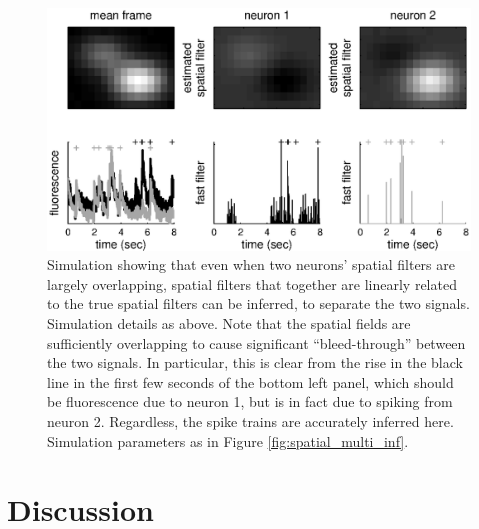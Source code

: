 \documentclass{article}
\begin{document}
\begin{figure}[h!]
\centering \includegraphics[width=.9\linewidth]{spatial_multi_learn}
\caption[overlapping spatial filters can be estimated]{Simulation showing that even when two neurons' spatial filters are largely overlapping, spatial filters that together are linearly related to the true spatial filters can be inferred, to separate the two signals. Simulation details as above. Note that the spatial fields are sufficiently overlapping to cause significant ``bleed-through'' between the two signals.  In particular, this is clear from the rise in the black line in the first few seconds of the bottom left panel, which should be fluorescence due to neuron 1, but is in fact due to spiking from neuron 2. Regardless, the spike trains are accurately inferred here.  Simulation parameters as in Figure \ref{fig:spatial_multi_inf}.} \label{fig:spatial_multi_learn}
\end{figure}





\section{Discussion} \label{sec:dis}

\end{document}
